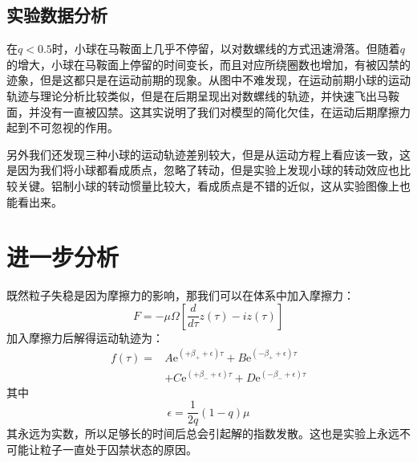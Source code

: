 \documentclass{WHUReport}
\begin{document}
\begin{multicols}{2}
	\subsection{实验数据分析}
	在$q<0.5$时，小球在马鞍面上几乎不停留，以对数螺线的方式迅速滑落。但随着$q$的增大，小球在马鞍面上停留的时间变长，而且对应所绕圈数也增加，有被囚禁的迹象，但是这都只是在运动前期的现象。从图中不难发现，在运动前期小球的运动轨迹与理论分析比较类似，但是在后期呈现出对数螺线的轨迹，并快速飞出马鞍面，并没有一直被囚禁。这其实说明了我们对模型的简化欠佳，在运动后期摩擦力起到不可忽视的作用。
	
	另外我们还发现三种小球的运动轨迹差别较大，但是从运动方程上看应该一致，这是因为我们将小球都看成质点，忽略了转动，但是实验上发现小球的转动效应也比较关键。铝制小球的转动惯量比较大，看成质点是不错的近似，这从实验图像上也能看出来。
	
	\section{进一步分析}
	既然粒子失稳是因为摩擦力的影响，那我们可以在体系中加入摩擦力：
	\begin{equation}
		F=-\mu \Omega\left[\frac{d}{d\tau}z(\tau)-iz(\tau)\right]
	\end{equation}
	加入摩擦力后解得运动轨迹为：
	\begin{equation}
		\begin{aligned}
			f(\tau)=&A\mathrm{e}^{(+\beta_++\epsilon)\tau}+B\mathrm{e}^{(-\beta_++\epsilon)\tau}\\&+C\mathrm{e}^{(+\beta_-+\epsilon)\tau}+D\mathrm{e}^{(-\beta_-+\epsilon)\tau}
		\end{aligned}
	\end{equation}
	其中
	\begin{equation}
		\epsilon=\frac{1}{2q}(1-q)\mu
	\end{equation}
	其永远为实数，所以足够长的时间后总会引起解的指数发散。这也是实验上永远不可能让粒子一直处于囚禁状态的原因。
	

\end{multicols}
\end{document}
